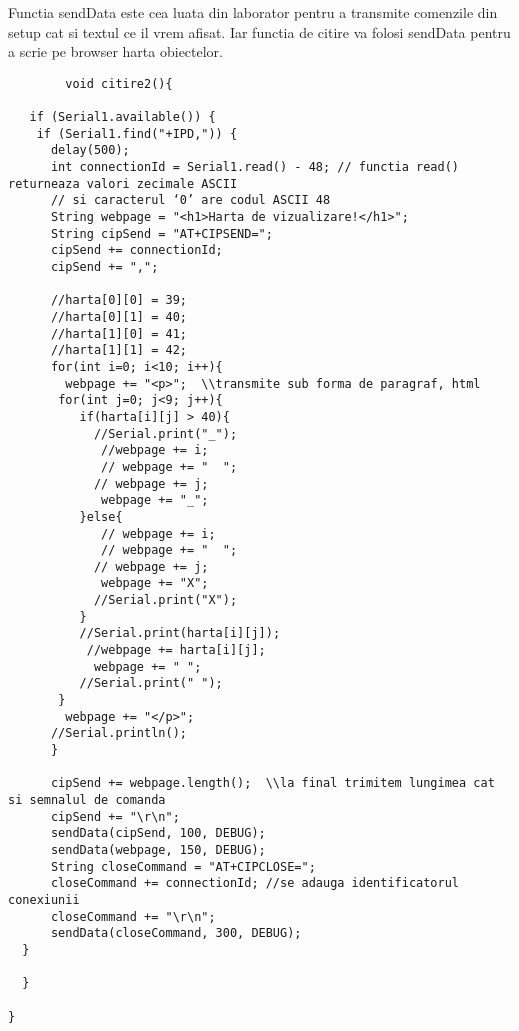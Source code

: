 \begin{itemize}
	\tab Functia sendData este cea luata din laborator pentru a transmite comenzile din setup cat si textul ce il vrem afisat. Iar functia de citire va folosi sendData pentru a scrie pe browser harta obiectelor.\\
	\begin{verbatim}
		void citire2(){

   if (Serial1.available()) { 
    if (Serial1.find("+IPD,")) { 
      delay(500); 
      int connectionId = Serial1.read() - 48; // functia read() returneaza valori zecimale ASCII 
      // si caracterul ‘0’ are codul ASCII 48 
      String webpage = "<h1>Harta de vizualizare!</h1>"; 
      String cipSend = "AT+CIPSEND="; 
      cipSend += connectionId; 
      cipSend += ","; 

      //harta[0][0] = 39;
      //harta[0][1] = 40;
      //harta[1][0] = 41;
      //harta[1][1] = 42;
      for(int i=0; i<10; i++){
        webpage += "<p>";  \\transmite sub forma de paragraf, html
       for(int j=0; j<9; j++){
          if(harta[i][j] > 40){
            //Serial.print("_");
             //webpage += i; 
             // webpage += "  ";   
            // webpage += j;  
             webpage += "_";  
          }else{
             // webpage += i; 
             // webpage += "  ";   
            // webpage += j;  
             webpage += "X"; 
            //Serial.print("X");
          }
          //Serial.print(harta[i][j]);
           //webpage += harta[i][j];
            webpage += " ";  
          //Serial.print(" ");
       }
        webpage += "</p>"; 
      //Serial.println();
      } 

      cipSend += webpage.length();  \\la final trimitem lungimea cat si semnalul de comanda
      cipSend += "\r\n"; 
      sendData(cipSend, 100, DEBUG); 
      sendData(webpage, 150, DEBUG); 
      String closeCommand = "AT+CIPCLOSE="; 
      closeCommand += connectionId; //se adauga identificatorul conexiunii 
      closeCommand += "\r\n"; 
      sendData(closeCommand, 300, DEBUG); 
  }
 
  }
  
}
       \end{verbatim}
\end{itemize}
	